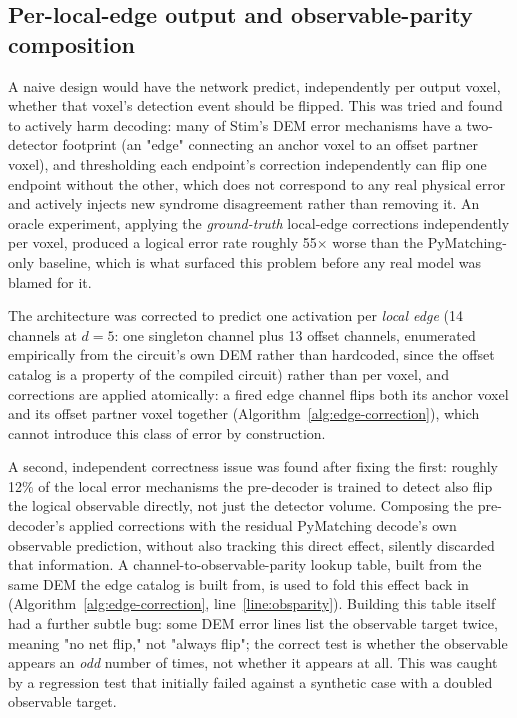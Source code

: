 \documentclass[pdflatex,sn-basic]{sn-jnl}
\begin{document}
\subsection{Per-local-edge output and observable-parity composition}\label{subsec:arch-edges}

A naive design would have the network predict, independently per output voxel, whether that voxel's detection event should be flipped. This was tried and found to actively harm decoding: many of Stim's DEM error mechanisms have a two-detector footprint (an "edge" connecting an anchor voxel to an offset partner voxel), and thresholding each endpoint's correction independently can flip one endpoint without the other, which does not correspond to any real physical error and actively injects new syndrome disagreement rather than removing it. An oracle experiment, applying the \emph{ground-truth} local-edge corrections independently per voxel, produced a logical error rate roughly 55\(\times\) worse than the PyMatching-only baseline, which is what surfaced this problem before any real model was blamed for it.

The architecture was corrected to predict one activation per \emph{local edge} (14 channels at \(d=5\): one singleton channel plus 13 offset channels, enumerated empirically from the circuit's own DEM rather than hardcoded, since the offset catalog is a property of the compiled circuit) rather than per voxel, and corrections are applied atomically: a fired edge channel flips both its anchor voxel and its offset partner voxel together (Algorithm~\ref{alg:edge-correction}), which cannot introduce this class of error by construction.

A second, independent correctness issue was found after fixing the first: roughly 12\% of the local error mechanisms the pre-decoder is trained to detect also flip the logical observable directly, not just the detector volume. Composing the pre-decoder's applied corrections with the residual PyMatching decode's own observable prediction, without also tracking this direct effect, silently discarded that information. A channel-to-observable-parity lookup table, built from the same DEM the edge catalog is built from, is used to fold this effect back in (Algorithm~\ref{alg:edge-correction}, line~\ref{line:obsparity}). Building this table itself had a further subtle bug: some DEM error lines list the observable target twice, meaning "no net flip," not "always flip"; the correct test is whether the observable appears an \emph{odd} number of times, not whether it appears at all. This was caught by a regression test that initially failed against a synthetic case with a doubled observable target.
\end{document}
